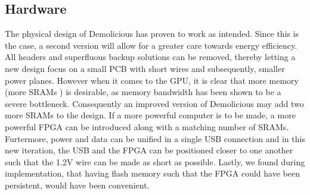 \subsection{Hardware}
The physical design of Demolicious has proven to work as intended.
Since this is the case, a second version will allow for a greater care towards energy efficiency.
All headers and superfluous backup solutions can be removed, thereby letting a new design focus on a small PCB with short wires and subsequently, smaller power planes.
However when it comes to the GPU, it is clear that more memory (more SRAMs ) is desirable, as memory bandwidth has been shown to be a severe bottleneck. 
Consequently an improved version of Demolicious may add two more SRAMs to the design.
If a more powerful computer is to be made, a more powerful FPGA can be introduced along with a matching number of SRAMs.
Furtermore, power and data can be unified in a single USB connection and in this new iteration, the USB and the FPGA can be positioned closer to one another such that the 1.2V wire can be made as short as possible.
Lastly, we found during implementation, that having flash memory such that the FPGA could have been persistent, would have been convenient. 
